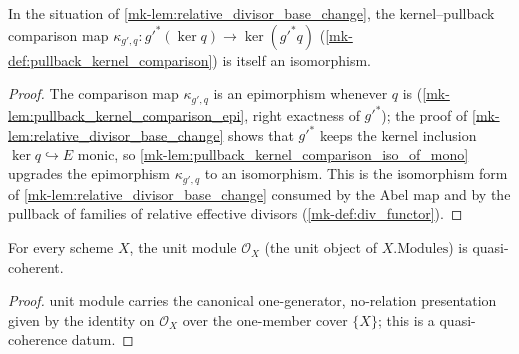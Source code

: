 \begin{lemma}\label{mk-lem:relative_divisor_base_change_comparison_iso}
  \leanok

  In the situation of \ref{mk-lem:relative_divisor_base_change}, the
  kernel--pullback comparison map
  \(\kappa_{g',q} : g'^{*}(\ker q) \to \ker(g'^{*} q)\)
  (\ref{mk-def:pullback_kernel_comparison}) is itself an isomorphism.
\end{lemma}
\begin{proof}
  \leanok{}
  The comparison map \(\kappa_{g',q}\) is an epimorphism whenever \(q\)
  is (\ref{mk-lem:pullback_kernel_comparison_epi}, right exactness of
  \(g'^{*}\)); the proof of \ref{mk-lem:relative_divisor_base_change} shows
  that \(g'^{*}\) keeps the kernel inclusion \(\ker q \hookrightarrow E\)
  monic, so \ref{mk-lem:pullback_kernel_comparison_iso_of_mono} upgrades
  the epimorphism \(\kappa_{g',q}\) to an isomorphism. This is the
  isomorphism form of \ref{mk-lem:relative_divisor_base_change} consumed by
  the Abel map and by the pullback of families of relative effective
  divisors (\ref{mk-def:div_functor}).
\end{proof}

\begin{lemma}\label{mk-lem:unit_isQuasicoherent}
  \leanok

  For every scheme \(X\), the unit module \(\mathcal O_X\) (the unit object
  of \(X.\mathrm{Modules}\)) is quasi-coherent.
\end{lemma}
\begin{proof}
  \leanokThe unit module carries the canonical one-generator, no-relation
  presentation given by the identity on \(\mathcal O_X\) over the
  one-member cover \(\{X\}\); this is a quasi-coherence datum.
\end{proof}

